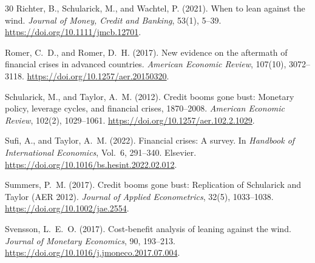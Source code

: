 \documentclass[11pt]{article}
\begin{document}
\begin{thebibliography}{30}
Richter, B., Schularick, M., and Wachtel, P. (2021).
\newblock When to lean against the wind.
\newblock \emph{Journal of Money, Credit and Banking}, 53(1), 5--39.
\newblock \url{https://doi.org/10.1111/jmcb.12701}.

Romer, C.~D., and Romer, D.~H. (2017).
\newblock New evidence on the aftermath of financial crises in advanced countries.
\newblock \emph{American Economic Review}, 107(10), 3072--3118.
\newblock \url{https://doi.org/10.1257/aer.20150320}.

Schularick, M., and Taylor, A.~M. (2012).
\newblock Credit booms gone bust: Monetary policy, leverage cycles, and financial crises,
  1870--2008.
\newblock \emph{American Economic Review}, 102(2), 1029--1061.
\newblock \url{https://doi.org/10.1257/aer.102.2.1029}.

Sufi, A., and Taylor, A.~M. (2022).
\newblock Financial crises: A survey.
\newblock In \emph{Handbook of International Economics}, Vol.~6, 291--340. Elsevier.
\newblock \url{https://doi.org/10.1016/bs.hesint.2022.02.012}.

Summers, P.~M. (2017).
\newblock Credit booms gone bust: Replication of {S}chularick and {T}aylor ({AER} 2012).
\newblock \emph{Journal of Applied Econometrics}, 32(5), 1033--1038.
\newblock \url{https://doi.org/10.1002/jae.2554}.

Svensson, L.~E.~O. (2017).
\newblock Cost-benefit analysis of leaning against the wind.
\newblock \emph{Journal of Monetary Economics}, 90, 193--213.
\newblock \url{https://doi.org/10.1016/j.jmoneco.2017.07.004}.
\end{thebibliography}
\end{document}
